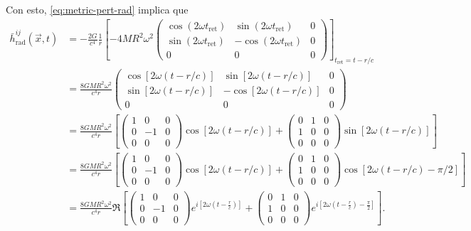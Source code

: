 \documentclass[letterpaper,11pt]{article}
\begin{document}
Con esto, \eqref{eq:metric-pert-rad} implica que\\
\begingroup
\allowdisplaybreaks
\begin{align}
\bar{h}_{\text{rad}}^{ij}(\vec{x},t) &= - \frac{2G}{c^4} \frac{1}{r}  \left[-4MR^2\omega^2\begin{pmatrix}
\cos(2\omega t_{\text{ret}}) & \sin(2\omega t_{\text{ret}}) & 0 \\
\sin(2\omega t_{\text{ret}}) & -\cos(2\omega t_{\text{ret}}) & 0 \\
0 & 0 & 0
\end{pmatrix} \right]_{t_{\text{ret}} = t - r/c} \nonumber \\
&= \frac{8GMR^2 \omega^2}{c^4 r} \begin{pmatrix}
\cos[2\omega (t - r/c)] & \sin[2\omega (t - r/c)] & 0 \\
\sin[2\omega (t - r/c)] & -\cos[2\omega (t - r/c)] & 0 \\
0 & 0 & 0
\end{pmatrix} \nonumber \\
&= \frac{8GMR^2 \omega^2}{c^4 r} \left[ \begin{pmatrix}
1 & 0 & 0 \\
0 & -1 & 0 \\
0 & 0 & 0
\end{pmatrix} \cos[2\omega(t - r/c)] + \begin{pmatrix}
0 & 1 & 0 \\
1 & 0 & 0 \\
0 & 0 & 0
\end{pmatrix} \sin[2\omega(t - r/c)]\right] \nonumber \\
&= \frac{8GMR^2 \omega^2}{c^4 r} \left[ \begin{pmatrix}
1 & 0 & 0 \\
0 & -1 & 0 \\
0 & 0 & 0
\end{pmatrix} \cos[2\omega(t - r/c)] + \begin{pmatrix}
0 & 1 & 0 \\
1 & 0 & 0 \\
0 & 0 & 0
\end{pmatrix} \cos[2\omega(t - r/c) - \pi/2]\right] \nonumber \\
&= \frac{8GMR^2 \omega^2}{c^4 r} \Re \left[ \begin{pmatrix}
1 & 0 & 0 \\
0 & -1 & 0 \\
0 & 0 & 0
\end{pmatrix} e^{i[2\omega(t - \frac{r}{c})]} + \begin{pmatrix}
0 & 1 & 0 \\
1 & 0 & 0 \\
0 & 0 & 0
\end{pmatrix} e^{i[2\omega(t - \frac{r}{c})- \frac{\pi}{2}] } \right] .
\end{align}
\endgroup
\end{document}
